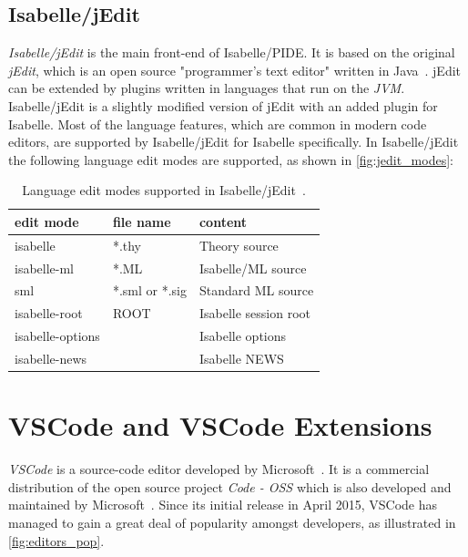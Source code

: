 \subsection*{Isabelle/jEdit}
\emph{Isabelle/jEdit} is the main front-end of Isabelle/PIDE. It is based on the original \emph{jEdit}, which is an open source "programmer's text editor" written in Java~\parencite{jedit}. jEdit can be extended by plugins written in languages that run on the \emph{JVM}. %
Isabelle/jEdit is a slightly modified version of jEdit with an added plugin for Isabelle. Most of the language features, which are common in modern code editors, are supported by Isabelle/jEdit for Isabelle specifically. In Isabelle/jEdit the following language edit modes are supported, as shown in \autoref{fig:jedit_modes}:

\begin{table}[ht]
  \centering
  \begin{tabular}{l l l}
    \toprule
        edit mode & file name & content \\
    \midrule
        isabelle & *.thy & Theory source \\
        isabelle-ml & *.ML & Isabelle/ML source \\
        sml & *.sml or *.sig & Standard ML source \\
        isabelle-root & ROOT & Isabelle session root \\
        isabelle-options & & Isabelle options \\
        isabelle-news & & Isabelle NEWS \\
    \bottomrule
  \end{tabular}
  \caption{Language edit modes supported in Isabelle/jEdit~\parencite{jedit}.}
  \label{fig:jedit_modes}
\end{table}

\section{VSCode and VSCode Extensions}
\label{section:vscode}
\emph{VSCode} is a source-code editor developed by Microsoft~\parencite{vscode}. It is a commercial distribution of the open source project \emph{Code - OSS} which is also developed and maintained by Microsoft~\parencite{code_oss}. Since its initial release in April 2015, VSCode has managed to gain a great deal of popularity amongst developers, as illustrated in \autoref{fig:editors_pop}.

